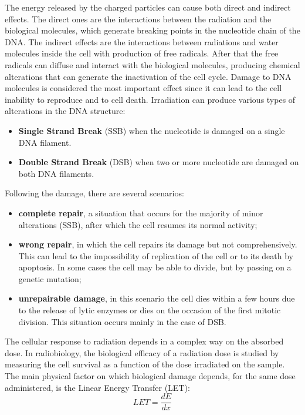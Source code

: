 \noindent The energy released by the charged particles can cause both direct and indirect effects.
The direct ones are the interactions between the radiation and the biological molecules,
which generate breaking points in the nucleotide chain of the DNA.
The indirect effects are the interactions between radiations and water molecules inside the cell with production of free radicals.
After that the free radicals can diffuse and interact with the biological molecules, producing chemical alterations that can generate the inactivation of the cell cycle.
Damage to DNA molecules is considered the most important effect since it can lead to the cell inability to reproduce and to cell death\cite{cells}.
\newline
Irradiation can produce various types of alterations in the DNA structure:
\begin{itemize}
	\item \textbf{Single Strand Break} (SSB) when the nucleotide is damaged on a single DNA filament.
	\item \textbf{Double Strand Break} (DSB) when two or more nucleotide are damaged on both DNA filaments. 
\end{itemize}
Following the damage, there are several scenarios:
\begin{itemize}
	\item \textbf{complete repair}, a situation that occurs for the majority of minor alterations (SSB), after which the cell resumes its normal activity;
	\item \textbf{wrong repair}, in which the cell repairs its damage but not comprehensively. This can lead to the impossibility of replication of the cell or to its death by apoptosis. In some cases the cell may be able to divide, but by passing on a genetic mutation;
	\item \textbf{unrepairable damage}, in this scenario the cell dies within a few hours due to the release of lytic enzymes or dies on the occasion of the first mitotic division. This situation occurs mainly in the case of DSB.
\end{itemize}
The cellular response to radiation depends in a complex way on the absorbed dose.
In radiobiology, the biological efficacy of a radiation dose is studied by measuring the cell survival as a function of the dose irradiated on the sample. The main physical factor on which biological damage depends, for the same dose administered, is the Linear Energy Transfer (LET)\cite{let}:   
\begin{equation}\label{eq:let}
	LET=\frac{dE}{dx}
\end{equation}
